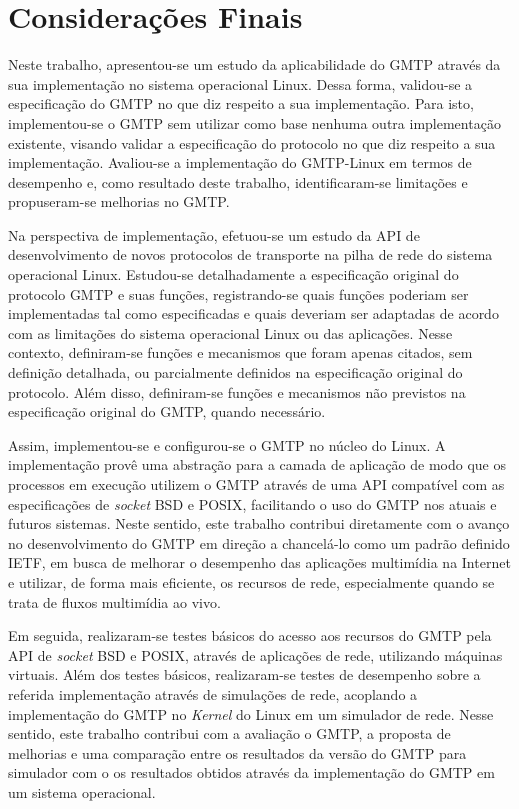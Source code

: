\chapter{Considerações Finais}
\label{cap:final}

Neste trabalho, apresentou-se um estudo da aplicabilidade do GMTP através da sua implementação no sistema operacional Linux. 
Dessa forma, validou-se a especificação do GMTP no que diz respeito a sua implementação. Para isto, implementou-se o GMTP sem utilizar como base nenhuma outra implementação existente, visando validar a especificação do protocolo no que diz respeito a sua implementação.
Avaliou-se a implementação do GMTP-Linux em termos de desempenho e, como resultado deste trabalho, identificaram-se limitações e propuseram-se melhorias no GMTP.

Na perspectiva de implementação, efetuou-se um estudo da API de desenvolvimento de novos protocolos de transporte na pilha de rede do sistema operacional Linux.
Estudou-se detalhadamente a especificação original do protocolo GMTP e suas funções, registrando-se quais funções poderiam ser implementadas tal como especificadas e quais deveriam ser adaptadas de acordo com as limitações do sistema operacional Linux ou das aplicações.
Nesse contexto, definiram-se funções e mecanismos que foram apenas citados, sem definição detalhada, ou parcialmente definidos na especificação original do protocolo. 
Além disso, definiram-se funções e mecanismos não previstos na especificação original do GMTP, quando necessário.

Assim, implementou-se e configurou-se o GMTP no núcleo do Linux. 
A implementação provê uma abstração para a camada de aplicação de modo que os processos em execução utilizem o GMTP através de uma API compatível com as especificações de \textit{socket} BSD e POSIX, facilitando o uso do GMTP nos atuais e futuros sistemas. 
Neste sentido, este trabalho contribui diretamente com o avanço no desenvolvimento do GMTP em direção a chancelá-lo como um padrão definido IETF, em busca de melhorar o desempenho das aplicações multimídia na Internet e utilizar, de forma mais eficiente, os recursos de rede, especialmente quando se trata de fluxos multimídia ao vivo.

Em seguida, realizaram-se testes básicos do acesso aos recursos do GMTP pela API de \textit{socket} BSD e POSIX, através de aplicações de rede, utilizando máquinas virtuais.
Além dos testes básicos, realizaram-se testes de desempenho sobre a referida implementação através de simulações de rede, acoplando a implementação do GMTP no \textit{Kernel} do Linux em um simulador de rede. 
Nesse sentido, este trabalho contribui com a avaliação o GMTP, a proposta de melhorias e uma comparação entre os resultados da versão do GMTP para simulador com o os resultados obtidos através da implementação do GMTP em um sistema operacional.

